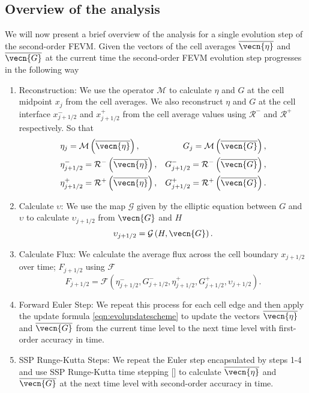 \subsection{Overview of the analysis}
We will now present a brief overview of the analysis for a single evolution step of the second-order FEVM. Given the vectors of the cell averages $\overline{\vecn{\eta}}$ and $\overline{\vecn{G}}$ at the current time the second-order FEVM evolution step progresses in the following way
\begin{enumerate}
	\item Reconstruction: We use the operator $\mathcal{M}$ to calculate $\eta$ and $G$ at the cell midpoint $x_{j}$ from the cell averages. We also reconstruct $\eta$ and $G$ at the cell interface $x^-_{j+1/2}$ and $x^+_{j+1/2}$ from the cell average values using $\mathcal{R}^{-}$ and $\mathcal{R}^{+}$ respectively. So that
	\begin{align*}	&\eta_j = \mathcal{M}\left(\overline{\vecn{\eta}}\right),& G_j = \mathcal{M}\left(\overline{\vecn{G}}\right),\\
	&\eta^-_{j+1/2} = \mathcal{R}^{-}\left(\overline{\vecn{\eta}}\right),  &G^-_{j+1/2} = \mathcal{R}^{-}\left(\overline{\vecn{G}}\right), \\
	&\eta^+_{j+1/2} = \mathcal{R}^{+}\left(\overline{\vecn{\eta}}\right),  &G^+_{j+1/2} = \mathcal{R}^{+}\left(\overline{\vecn{G}}\right). \\	
	\end{align*}
	\item Calculate $\upsilon$: We use the map $\mathcal{G}$ given by the elliptic equation between $G$ and $\upsilon$ to calculate $\upsilon_{j+1/2} $ from ${\vecn{G}}$ and $H$
	\[\upsilon_{j+1/2} = \mathcal{G}\left(H, {\vecn{G}}\right).\]
	\item Calculate Flux: We calculate the average flux across the cell boundary $x_{j+1/2}$ over time; $F_{j+1/2}$ using $\mathcal{F}$
	\[F_{j+1/2} =\mathcal{F} \left(\eta^-_{j+1/2}, G^-_{j+1/2},\eta^+_{j+1/2}, G^+_{j+1/2},\upsilon_{j+1/2}  \right). \]
	\item Forward Euler Step: We repeat this process for each cell edge and then apply the update formula \eqref{eqn:evolupdatescheme} to update the vectors $\overline{\vecn{\eta}}$ and $\overline{\vecn{G}}$ from the current time level to the next time level with first-order accuracy in time.
	\item SSP Runge-Kutta Steps: We repeat the Euler step encapsulated by steps 1-4 and use SSP Runge-Kutta time stepping [] to calculate $\overline{\vecn{\eta}}$ and $\overline{\vecn{G}}$ at the next time level with second-order accuracy in time.
\end{enumerate}

